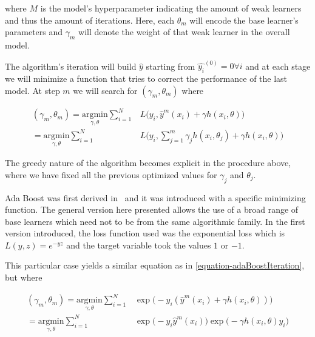 where $M$ is the model's hyperparameter indicating the amount of weak learners and thus the amount of iterations. Here, each $\theta_m$ will encode the base learner's parameters and $\gamma_m$ will denote the weight of that weak learner in the overall model.

The algorithm's iteration will build $\hat{y}$ starting from $\hat{y_i}^{(0)}= 0 \forall i$ and at each stage we will minimize a function that tries to correct the performance of the last model. At step $m$ we will search for $(\gamma_{m}, \theta_{m})$ where

\begin{equation}\label{equation-adaBoostIteration}
\begin{split}
(\gamma_{m}, \theta_{m}) = \underset{\gamma, \theta}{\mathrm{argmin}} \sum_{i=1}^{N} & L\big( y_i,  \hat{y}^{m}(x_i) + \gamma h(x_i,\theta) \big) \\
= \underset{\gamma, \theta}{\mathrm{argmin}} \sum_{i=1}^{N} & L\big( y_i,  \sum_{j=1}^{m} \gamma_j h(x_i,\theta_j) + \gamma h(x_i,\theta) \big)
\end{split}
\end{equation}

The greedy nature of the algorithm becomes explicit in the procedure above, where we have fixed all the previous optimized values for $\gamma_j$ and $\theta_j$.

Ada Boost was first derived in~\textcite{schapire-adaBoost} and it was introduced with a specific minimizing function. The general version here presented allows the use of a broad range of base learners which need not to be from the same algorithmic family. In the first version introduced, the loss function used was the exponential loss which is $L(y,z) = e^{-yz}$ and the target variable took the values $1$ or $-1$.

This particular case yields a similar equation as in \cref{equation-adaBoostIteration}, but where

\begin{equation}\label{equation-adaBoostExponentialIteration}
\begin{split}
(\gamma_{m}, \theta_{m}) = \underset{\gamma, \theta}{\mathrm{argmin}} \sum_{i=1}^{N} & \exp\big( -y_i (\hat{y}^{m}(x_i) + \gamma h(x_i,\theta) )\big) \\
= \underset{\gamma, \theta}{\mathrm{argmin}} \sum_{i=1}^{N} &
\exp\big( -y_i \hat{y}^{m}(x_i)\big) \exp\big(- \gamma h(x_i,\theta)y_i \big)
\end{split}
\end{equation}


